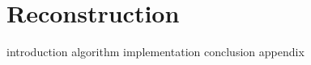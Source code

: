 \documentclass[a4paper, openany, oneside]{memoir}
\begin{document}
\chapter{Reconstruction}
\label{cha:reconstruction}

{introduction}
{algorithm}
{implementation}
{conclusion}
{appendix}
\end{document}

